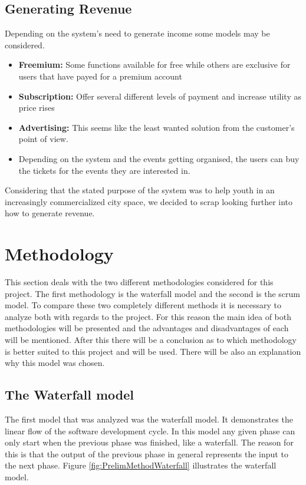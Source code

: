 \subsection{Generating Revenue}
\label{subsec:PrelimMarketRevenue}
Depending on the system’s need to generate income some models may be considered. 
\begin{itemize}
  \item \textbf{Freemium:} Some functions available for free while others are exclusive for users that have payed for a premium account
  \item \textbf{Subscription:} Offer several different levels of payment and increase utility as price rises
  \item \textbf{Advertising:} This seems like the least wanted solution from the customer’s point of view.
  \item Depending on the system and the events getting organised, the users can buy the tickets for the events they are interested in.
\end{itemize}

Considering that the stated purpose of the system was to help youth in an increasingly commercialized city space, we decided to scrap looking further into how to generate revenue.

\section{Methodology}
\label{sec:PrelimMethod}

This section deals with the two different methodologies considered for this project. The first methodology is the waterfall model and the second is the scrum model. To compare these two completely different methods it is necessary to analyze both with regards to the project. For this reason the main idea of both methodologies will be presented and the advantages and disadvantages of each will be mentioned. After this there will be a conclusion as to which methodology is better suited to this project and will be used. There will be also an explanation why this model was chosen.

\subsection{The Waterfall model}
\label{sec:PrelimMethodWaterfall}
The first model that was analyzed was the waterfall model. It demonstrates the linear flow of the software development cycle. In this model any given phase can only start when the previous phase was finished, like a waterfall. The reason for this is that the output of the previous phase in general represents the input to the next phase. Figure \ref{fig:PrelimMethodWaterfall} illustrates the waterfall model.

